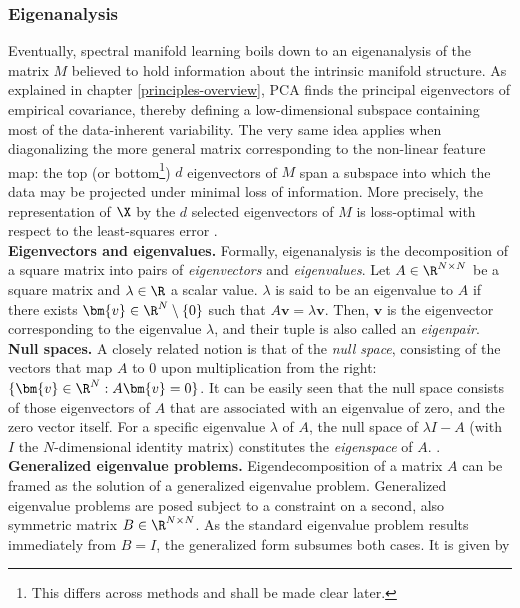 \subsubsection{Eigenanalysis}
\label{eigenanalysis}

Eventually, spectral manifold learning boils down to an eigenanalysis 
of the matrix $M$ believed to hold information about the intrinsic manifold 
structure.
As explained in chapter \ref{principles-overview}, PCA finds the principal 
eigenvectors of empirical covariance, thereby defining a low-dimensional 
subspace containing most of the data-inherent variability.
The very same idea applies when diagonalizing the more general matrix 
corresponding to the non-linear feature map: the top (or bottom\footnote{
This differs across methods and shall be made clear later.
}) $d$ eigenvectors of $M$ span a subspace into which the data may be projected 
under minimal loss of information.
More precisely, the representation of $\X$ by the $d$ selected eigenvectors of 
$M$ is loss-optimal with respect to the least-squares error
\citep{schoelkopfetal1998}.
\\

\textbf{Eigenvectors and eigenvalues.} Formally, eigenanalysis is the 
decomposition of a square matrix into pairs of \textit{eigenvectors} and 
\textit{eigenvalues}.
Let $A \in \R^{N \times N}$ be a square matrix and $\lambda \in \R$ a scalar 
value. 
$\lambda$ is said to be an eigenvalue to $A$ if there exists 
$\bm{v} \in \R^N \setminus \{0\}$ such that $A \bm{v} = \lambda \bm{v}$.
Then, $\bm{v}$ is the eigenvector corresponding to the eigenvalue $\lambda$, and 
their tuple is also called an \textit{eigenpair}.
\\

\textbf{Null spaces.} A closely related notion is that of the 
\textit{null space}, consisting of the vectors that map $A$ to 0 upon 
multiplication from the right: $\{\bm{v} \in \R^N: A \bm{v} = 0\}$.
It can be easily seen that the null space consists of those eigenvectors of $A$ 
that are associated with an eigenvalue of zero, and the zero vector itself.
For a specific eigenvalue $\lambda$ of $A$, the null space of $\lambda I - A$ 
(with $I$ the $N$-dimensional identity matrix) constitutes the 
\textit{eigenspace} of $A$.
\citep{boermmehl2012}.
\\

\textbf{Generalized eigenvalue problems.} Eigendecomposition of a matrix $A$ can 
be framed as the solution of a generalized eigenvalue problem.
Generalized eigenvalue problems are posed subject to a constraint on a second, 
also symmetric matrix $B \in \R^{N \times N}$.
As the standard eigenvalue problem results immediately from $B = I$, the 
generalized form subsumes both cases.
It is given by 

